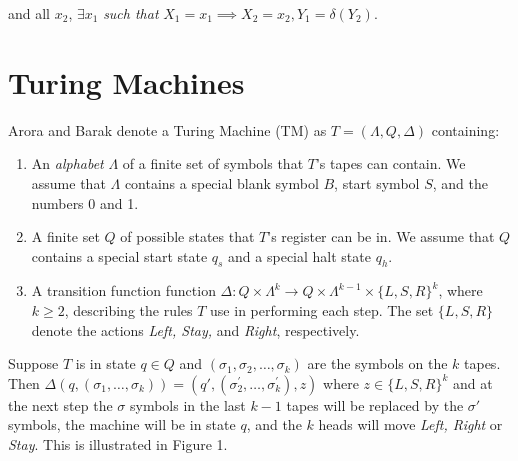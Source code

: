 \documentclass[11pt]{article}
\begin{document}
\quad and all $ x_2 $, $ \exists x_1 $ \textit{ such that } $ X_1 = x_1 \implies X_2 = x_2, Y_1 = \delta(Y_2) $. \\

\section{Turing Machines} 


 Arora and Barak denote a Turing Machine (TM) as $ T = (\Lambda, Q, \Delta) $ containing:
\begin{enumerate}
\item An \textit{alphabet} $ \Lambda $ of a finite set of symbols that $ T $'s tapes can contain. We assume that $ \Lambda $ contains a special blank symbol $ B $, start symbol $ S $, and the numbers 0 and 1. 
\item A finite set $ Q $ of possible states that $ T $'s register can be in. We assume that $ Q $ contains a special start state $ q_{s} $ and a special halt state $ q_{h} $. 
\item A transition function function $ \Delta : Q \times \Lambda^{k} \rightarrow Q \times \Lambda^{k - 1} \times \{L, S, R\}^{k} $, where $ k \geq 2$, describing the rules $ T $ use in performing each step. The set $\{L ,S, R\}$ denote the actions \textit{Left, Stay,} and \textit{Right}, respectively. 
\end{enumerate}

Suppose $ T $ is in state $ q \in Q $ and $ (\sigma_1, \sigma_2, \dots, \sigma_k) $ are the symbols on the $ k $ tapes. Then $ \Delta(q, (\sigma_1, \dots, \sigma_k)) = (q', (\sigma_{2}^{'}, \dots, \sigma_{k}^{'}), z) $ where $ z \in \{L, S, R\}^k $ and at the next step the $ \sigma $ symbols in the last $ k - 1 $ tapes will be replaced by the $ \sigma' $ symbols, the machine will be in state $ q $, and the $ k $ heads will move \textit{Left, Right} or \textit{Stay}. This is illustrated in Figure 1. \\
\end{document}
